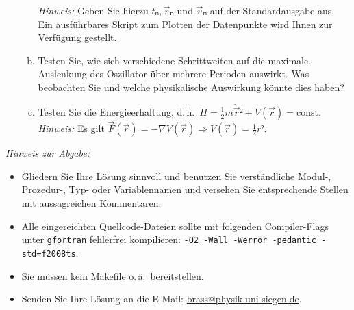 \begin{question}[subtitle=Euler-Verfahren]
\begin{enumerate}[(i)]
\begin{enumerate}[a)]
      \textit{Hinweis:} Geben Sie hierzu $tₙ, \vec{r}ₙ$ und $\vec{v}ₙ$ auf der Standardausgabe aus. Ein ausführbares Skript zum Plotten der Datenpunkte wird Ihnen zur Verfügung gestellt.
    \item Testen Sie, wie sich verschiedene Schrittweiten auf die maximale Auslenkung des Oszillator über mehrere Perioden auswirkt.
      Was beobachten Sie und welche physikalische Auswirkung könnte dies haben?
    \item Testen Sie die Energieerhaltung, d.\,h.\ $H = \frac{1}{2}m\dot{\vec{r}}² + V(\vec{r}) = \text{const}$.\\
      \textit{Hinweis:} Es gilt $\vec{F}(\vec{r}) = - ∇V(\vec{r}) ⇒ V(\vec{r}) = \frac{1}{2}r²$.
    \end{enumerate}
  \end{enumerate}
\end{question}

\textit{Hinweis zur Abgabe:}
\begin{itemize}
\item Gliedern Sie Ihre Lösung sinnvoll und benutzen Sie verständliche Modul-, Prozedur-, Typ- oder Variablennamen und versehen Sie entsprechende Stellen mit aussagreichen Kommentaren.
\item Alle eingereichten Quellcode-Dateien sollte mit folgenden Compiler-Flags unter \verb|gfortran| fehlerfrei kompilieren: \verb|-O2 -Wall -Werror -pedantic -std=f2008ts|.
\item Sie müssen kein Makefile o.\,ä.\ bereitstellen.
\item Senden Sie Ihre Lösung an die E-Mail: \url{brass@physik.uni-siegen.de}.
\end{itemize}

